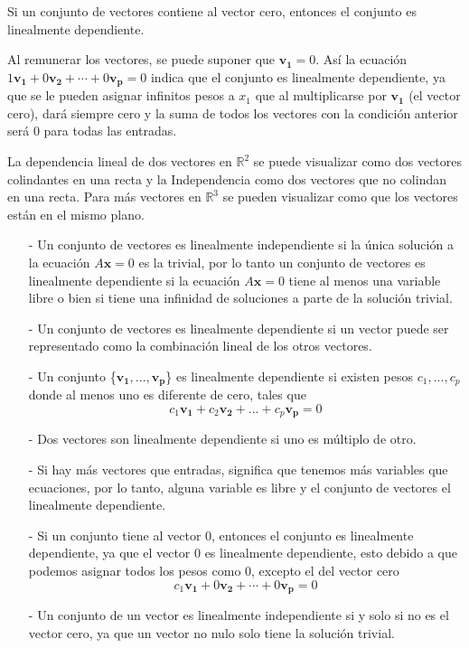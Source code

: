 \documentclass{article}
\begin{document}
\begin{tcolorbox}[colback=red!10!white, colframe=red!70!black, title=Caso especial 2]
    Si un conjunto de vectores contiene al vector cero, entonces el conjunto es linealmente dependiente.
\end{tcolorbox}

Al remunerar los vectores, se puede suponer que $\mathbf{v_1} = 0$. Así la ecuación $1\mathbf{v_1} + 0\mathbf{v_2} + \dotsb + 0\mathbf{v_p} = 0$ indica que el conjunto es linealmente dependiente, ya que se le pueden asignar infinitos pesos a $x_1$ que al multiplicarse por $\mathbf{v_1}$ (el vector cero), dará siempre cero y la suma de todos los vectores con la condición anterior será 0 para todas las entradas. \cite{DavidC}

\begin{tcolorbox}[colback=red!10!white, colframe=red!70!black, title=Resumen]
    La dependencia lineal de dos vectores en $\mathbb{R}^2$ se puede visualizar como dos vectores colindantes en una recta y la Independencia como dos vectores que no colindan en una recta. Para más vectores en $\mathbb{R}^3$ se pueden visualizar como que los vectores están en el mismo plano.
    \begin{itemize}
        \item[-] Un conjunto de vectores es linealmente independiente si la única solución a la ecuación $A\mathbf{x} = 0$ es la trivial, por lo tanto un conjunto de vectores es linealmente dependiente si la ecuación $A\mathbf{x} = 0$ tiene al menos una variable libre o bien si tiene una infinidad de soluciones a parte de la solución trivial.
        \item[-] Un conjunto de vectores es linealmente dependiente si un vector puede ser representado como la combinación lineal de los otros vectores.
        \item[-]  Un conjunto \{$\mathbf{v_1},..., \mathbf{v_p}$\} es linealmente dependiente si existen pesos $c_1, ..., c_p$ donde al menos uno es diferente de cero, tales que $$c_1\mathbf{v_1} + c_2\mathbf{v_2} + ... + c_p\mathbf{v_p} = 0$$
        \item[-] Dos vectores son linealmente dependiente si uno es múltiplo de otro. 
        \item[-] Si hay más vectores que entradas, significa que tenemos más variables que ecuaciones, por lo tanto, alguna variable es libre y el conjunto de vectores el linealmente dependiente. 
        \item[-] Si un conjunto tiene al vector 0, entonces el conjunto es linealmente dependiente, ya que el vector 0 es linealmente dependiente, esto debido a que podemos asignar todos los pesos como 0, excepto el del vector cero $$c_1\mathbf{v_1} + 0\mathbf{v_2} + \dotsb + 0\mathbf{v_p} = 0$$
        \item[-] Un conjunto de un vector es linealmente independiente si y solo si no es el vector cero, ya que un vector no nulo solo tiene la solución trivial.  
    \end{itemize}
\end{tcolorbox}


\end{document}
